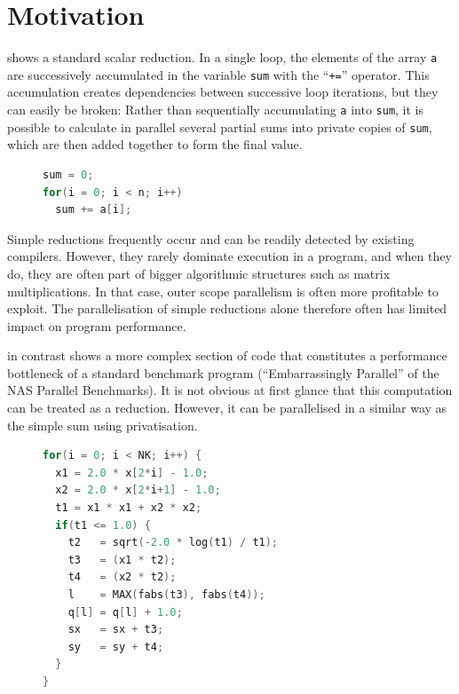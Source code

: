 \section{Motivation}

     shows a standard scalar reduction.
    In a single loop, the elements of the array \texttt{a} are successively
    accumulated in the variable \texttt{sum} with the ``\texttt{+=}'' operator.
    This accumulation creates dependencies between successive loop iterations,
    but they can easily be broken:
    Rather than sequentially accumulating {\tt a} into {\tt sum}, it is possible
    to calculate in parallel several partial sums into private copies of
    \texttt{sum}, which are then added together to form the final value.

\begin{figure}[h]
\begin{lstlisting}[language=C++,label={sum-figure},caption=
    {The most conventional example of a reduction is adding up all values in an
     array.\leftskip=0pt\rightskip=0pt}]
sum = 0;
for(i = 0; i < n; i++)
  sum += a[i];
\end{lstlisting}
\end{figure}

    Simple reductions frequently occur and can be readily detected by existing
    compilers.
    However, they rarely dominate execution in a program, and when they do, they
    are often part of bigger algorithmic structures such as matrix
    multiplications.
    In that case, outer scope parallelism is often more profitable to exploit.
    The parallelisation of simple reductions alone therefore often has limited
    impact on program performance.

     in contrast shows a more complex
    section of code that constitutes a performance bottleneck of a standard
    benchmark program
    (``Embarrassingly Parallel'' of the NAS Parallel Benchmarks).
    It is not obvious at first glance that this computation can be treated as a
    reduction.
    However, it can be parallelised in a similar way as the simple sum using
    privatisation.

\begin{figure}[h]
\begin{lstlisting}[language=C++,label={complex-reduction-figure},caption=
   {Example of ``complex reductions and histograms'' computation:
    This bottleneck from NAS Parallel Benchmarks can be parallelised as
    reductions by privatising variables \texttt{sx}, \texttt{sy}, \texttt{q[]}.
    \parfillskip=0pt}]
for(i = 0; i < NK; i++) {
  x1 = 2.0 * x[2*i] - 1.0;
  x2 = 2.0 * x[2*i+1] - 1.0;
  t1 = x1 * x1 + x2 * x2;
  if(t1 <= 1.0) {
    t2   = sqrt(-2.0 * log(t1) / t1);
    t3   = (x1 * t2);
    t4   = (x2 * t2);
    l    = MAX(fabs(t3), fabs(t4));
    q[l] = q[l] + 1.0;
    sx   = sx + t3;
    sy   = sy + t4;
  }
}
\end{lstlisting}
\end{figure}

